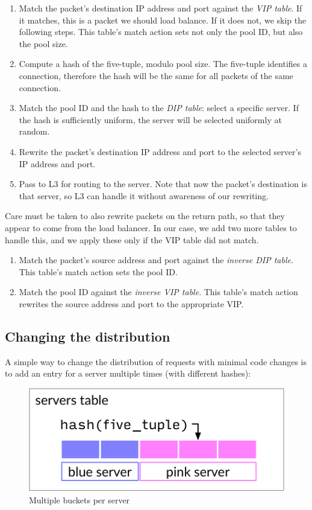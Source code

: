 \documentclass[11pt,oneside,a4paper]{article}
\begin{document}
\begin{enumerate}
\item Match the packet's destination IP address and port against the \emph{VIP
    table}.
    If it matches, this is a packet we should load balance.
    If it does not, we skip the following steps.
    This table's match action sets not only the pool ID, but also the pool size.
\item Compute a hash of the five-tuple, modulo pool size.
    The five-tuple identifies a connection, therefore the hash will be the same
    for all packets of the same connection.
\item Match the pool ID and the hash to the \emph{DIP table}: select a specific
    server.
    If the hash is sufficiently uniform, the server will be selected uniformly
    at random.
\item Rewrite the packet's destination IP address and port to the selected
    server's IP address and port.
\item Pass to L3 for routing to the server.
   Note that now the packet's destination is that server, so L3 can handle it
   without awareness of our rewriting.
\end{enumerate}

Care must be taken to also rewrite packets on the return path, so that they
appear to come from the load balancer.
In our case, we add two more tables to handle this, and we apply these only if
the VIP table did not match.

\begin{enumerate}
\item Match the packet's source address and port against the \emph{inverse DIP
    table}.
    This table's match action sets the pool ID.
\item Match the pool ID against the \emph{inverse VIP table}.
    This table's match action rewrites the source address and port to the
    appropriate VIP.
\end{enumerate}

\subsection{Changing the distribution}
A simple way to change the distribution of requests with minimal code changes is
to add an entry for a server multiple times (with different hashes):

\begin{figure}[h]
\centering
\includegraphics[width=.5\textwidth]{figures/buckets.pdf}
\caption{Multiple buckets per server}
\label{fig:buckets}
\end{figure}
\end{document}
